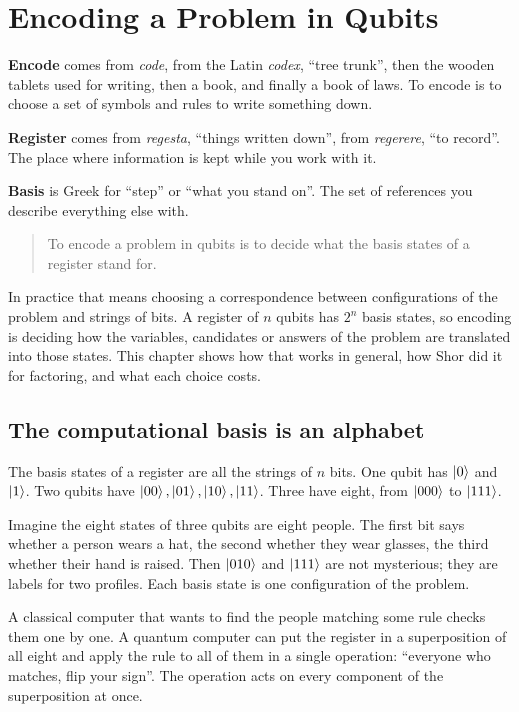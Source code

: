 \chapter{Encoding a Problem in Qubits}\label{ch:encoding}

\begin{etymology}
\textbf{Encode} comes from \emph{code}, from the Latin \emph{codex}, ``tree
trunk'', then the wooden tablets used for writing, then a book, and finally a
book of laws. To encode is to choose a set of symbols and rules to write something
down.

\textbf{Register} comes from \emph{regesta}, ``things written down'', from
\emph{regerere}, ``to record''. The place where information is kept while you
work with it.

\textbf{Basis} is Greek for ``step'' or ``what you stand on''. The set of
references you describe everything else with.
\end{etymology}

\begin{quote}
To encode a problem in qubits is to decide what the basis states of a register
stand for.
\end{quote}

In practice that means choosing a correspondence between configurations of the
problem and strings of bits. A register of $n$ qubits has $2^n$ basis states, so
encoding is deciding how the variables, candidates or answers of the problem are
translated into those states. This chapter shows how that works in general, how
Shor did it for factoring, and what each choice costs.

\section{The computational basis is an alphabet}

The basis states of a register are all the strings of $n$ bits. One qubit has
$\ket0$ and $\ket1$. Two qubits have $\ket{00}, \ket{01}, \ket{10}, \ket{11}$. Three
have eight, from $\ket{000}$ to $\ket{111}$.

Imagine the eight states of three qubits are eight people. The first bit says
whether a person wears a hat, the second whether they wear glasses, the third
whether their hand is raised. Then $\ket{010}$ and $\ket{111}$ are not mysterious;
they are labels for two profiles. Each basis state is one configuration of the
problem.

A classical computer that wants to find the people matching some rule checks them
one by one. A quantum computer can put the register in a superposition of all
eight and apply the rule to all of them in a single operation: ``everyone who
matches, flip your sign''. The operation acts on every component of the
superposition at once.

